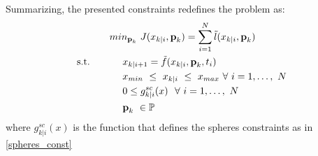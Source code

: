 Summarizing, the presented constraints redefines the problem as:
\begin{equation} 
	\begin{split}
			& min_{\textbf{p}_k}\ J({x}_{k|i},\textbf{p}_k) = \sum_{i=1}^{N}\tilde{l}({x}_{k|i},\textbf{p}_k) \\
			\textnormal{s.t.}\qquad
			&\ \ \ \ x_{k|i+1}=\tilde{f}(x_{k|i},\textbf{p}_k,t_i) \\
			&\ \ \ \ {x}_{min}\ \leq\ x_{k|i}\ \leq\ {x}_{max}\  \forall\ i=1,\dots,\ N  \\
			&\ \ \ \ 0 \leq g^{sc}_{k|i}(x)\ \ \forall\ i=1,\dots,\ N \\
			&\ \ \ \ \textbf{p}_k\   \in \mathbb{P}\ \\
	\end{split}	
	\label{ourproblem_param_vinc}
\end{equation}
where $g^{sc}_{k|i}(x)$ is the function that defines the spheres constraints as in \ref{spheres_const}

